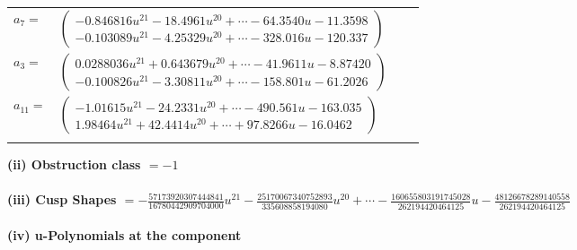 \documentclass[1p]{elsarticle_modified}
\theoremstyle{definition}
\begin{document}
\begin{tabular}{m{7pt} m{180pt} m{7pt} m{180pt} }
\flushright $a_{7}=$&$\begin{pmatrix}-0.846816 u^{21}-18.4961 u^{20}+\cdots-64.3540 u-11.3598\\-0.103089 u^{21}-4.25329 u^{20}+\cdots-328.016 u-120.337\end{pmatrix}$ \\
\flushright $a_{3}=$&$\begin{pmatrix}0.0288036 u^{21}+0.643679 u^{20}+\cdots-41.9611 u-8.87420\\-0.100826 u^{21}-3.30811 u^{20}+\cdots-158.801 u-61.2026\end{pmatrix}$ \\
\flushright $a_{11}=$&$\begin{pmatrix}-1.01615 u^{21}-24.2331 u^{20}+\cdots-490.561 u-163.035\\1.98464 u^{21}+42.4414 u^{20}+\cdots+97.8266 u-16.0462\end{pmatrix}$\\&\end{tabular}
\flushleft \textbf{(ii) Obstruction class $= -1$}\\~\\
\flushleft \textbf{(iii) Cusp Shapes $= -\frac{57173920307444841}{16780442909704000} u^{21}-\frac{25170067340752893}{335608858194080} u^{20}+\cdots-\frac{160655803191745028}{262194420464125} u-\frac{48126678289140558}{262194420464125}$}\\~\\
\newpage\renewcommand{\arraystretch}{1}
\flushleft \textbf{(iv) u-Polynomials at the component}\newline \\
\end{document}

